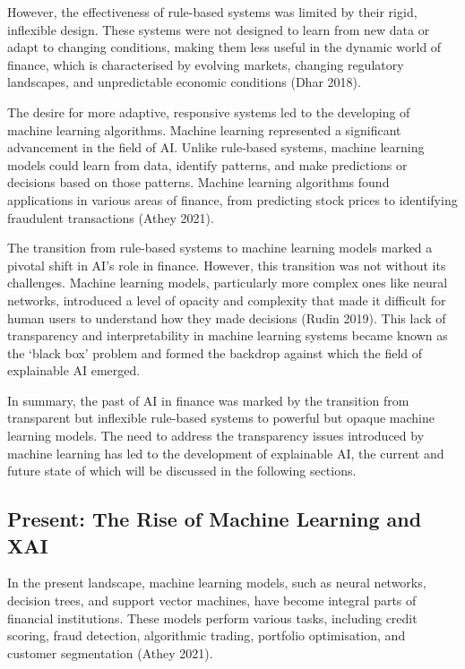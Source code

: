 \documentclass[
  letterpaper,
  DIV=11,
  numbers=noendperiod]{scrartcl}
\begin{document}
However, the effectiveness of rule-based systems was limited by their
rigid, inflexible design. These systems were not designed to learn from
new data or adapt to changing conditions, making them less useful in the
dynamic world of finance, which is characterised by evolving markets,
changing regulatory landscapes, and unpredictable economic conditions
(Dhar 2018).

The desire for more adaptive, responsive systems led to the developing
of machine learning algorithms. Machine learning represented a
significant advancement in the field of AI. Unlike rule-based systems,
machine learning models could learn from data, identify patterns, and
make predictions or decisions based on those patterns. Machine learning
algorithms found applications in various areas of finance, from
predicting stock prices to identifying fraudulent transactions (Athey
2021).

The transition from rule-based systems to machine learning models marked
a pivotal shift in AI's role in finance. However, this transition was
not without its challenges. Machine learning models, particularly more
complex ones like neural networks, introduced a level of opacity and
complexity that made it difficult for human users to understand how they
made decisions (Rudin 2019). This lack of transparency and
interpretability in machine learning systems became known as the `black
box' problem and formed the backdrop against which the field of
explainable AI emerged.

In summary, the past of AI in finance was marked by the transition from
transparent but inflexible rule-based systems to powerful but opaque
machine learning models. The need to address the transparency issues
introduced by machine learning has led to the development of explainable
AI, the current and future state of which will be discussed in the
following sections.

\hypertarget{present-the-rise-of-machine-learning-and-xai}{%
\subsection{Present: The Rise of Machine Learning and
XAI}\label{present-the-rise-of-machine-learning-and-xai}}

In the present landscape, machine learning models, such as neural
networks, decision trees, and support vector machines, have become
integral parts of financial institutions. These models perform various
tasks, including credit scoring, fraud detection, algorithmic trading,
portfolio optimisation, and customer segmentation (Athey 2021).
\end{document}
